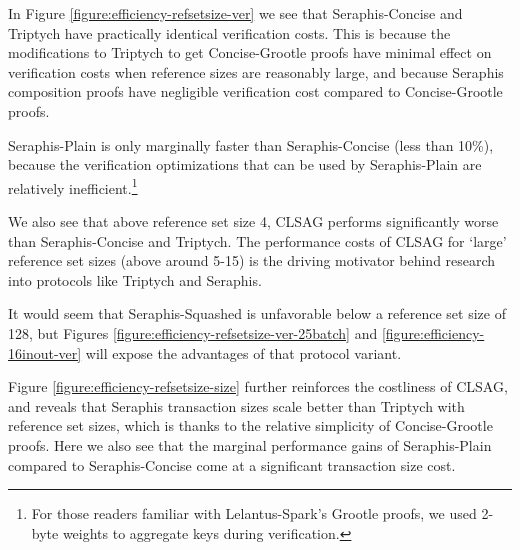 In Figure \ref{figure:efficiency-refsetsize-ver} we see that Seraphis-Concise and Triptych have practically identical verification costs. This is because the modifications to Triptych to get Concise-Grootle proofs have minimal effect on verification costs when reference sizes are reasonably large, and because Seraphis composition proofs have negligible verification cost compared to Concise-Grootle proofs.

Seraphis-Plain is only marginally faster than Seraphis-Concise (less than 10\%), because the verification optimizations that can be used by Seraphis-Plain are relatively inefficient.\footnote{For those readers familiar with Lelantus-Spark's Grootle proofs, we used 2-byte weights to aggregate keys during verification.}

We also see that above reference set size 4, CLSAG performs significantly worse than Seraphis-Concise and Triptych. The performance costs of CLSAG for `large' reference set sizes (above around 5-15) is the driving motivator behind research into protocols like Triptych and Seraphis.

It would seem that Seraphis-Squashed is unfavorable below a reference set size of 128, but Figures \ref{figure:efficiency-refsetsize-ver-25batch} and \ref{figure:efficiency-16inout-ver} will expose the advantages of that protocol variant.

Figure \ref{figure:efficiency-refsetsize-size} further reinforces the costliness of CLSAG, and reveals that Seraphis transaction sizes scale better than Triptych with reference set sizes, which is thanks to the relative simplicity of Concise-Grootle proofs. Here we also see that the marginal performance gains of Seraphis-Plain compared to Seraphis-Concise come at a significant transaction size cost.

